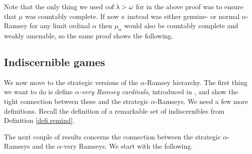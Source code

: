 \documentclass[../main]{subfiles}
\begin{document}
Note that the only thing we used $\operatorname{cof}\lambda>\omega$ for in the above proof was to ensure that $\mu$ was countably complete. If now $\kappa$ instead was either genuine- or normal $\alpha$-Ramsey for any limit ordinal $\alpha$ then $\mu_\alpha$ would also be countably complete and weakly amenable, so the same proof shows the following.



\subsection*{Indiscernible games}

We now move to the strategic versions of the $\alpha$-Ramsey hierarchy. The first thing we want to do is define \textit{$\alpha$-very Ramsey cardinals}, introduced in \cite{SharpeWelch}, and show the tight connection between these and the strategic $\alpha$-Ramseys. We need a few more definitions. Recall the definition of a remarkable set of indiscernibles from Definition \ref{defi.remind}.




The next couple of results concerns the connection between the strategic $\alpha$-Ramseys and the $\alpha$-very Ramseys. We start with the following.
\end{document}
